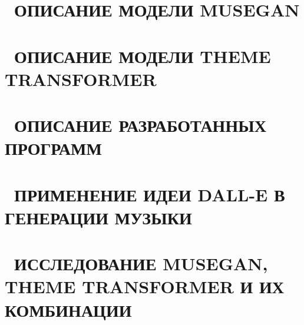 \documentclass{disser}
\begin{document}



\setcounter{page}{3}



\thispagestyle{empty}

\tableofcontents                          %
\thispagestyle{empty}


\chapter{~ОПИСАНИЕ МОДЕЛИ MUSEGAN}\label{chapter1}
	
	
\chapter{~ОПИСАНИЕ МОДЕЛИ THEME TRANSFORMER}\label{chapter2}
	

\chapter{~ОПИСАНИЕ РАЗРАБОТАННЫХ ПРОГРАММ}\label{chapter31}
    

\chapter{~ПРИМЕНЕНИЕ ИДЕИ DALL-E В ГЕНЕРАЦИИ МУЗЫКИ}\label{chapter3}
    

\chapter{~ИССЛЕДОВАНИЕ MUSEGAN, THEME TRANSFORMER И ИХ КОМБИНАЦИИ}\label{chapter4}
    
 
\end{document}
